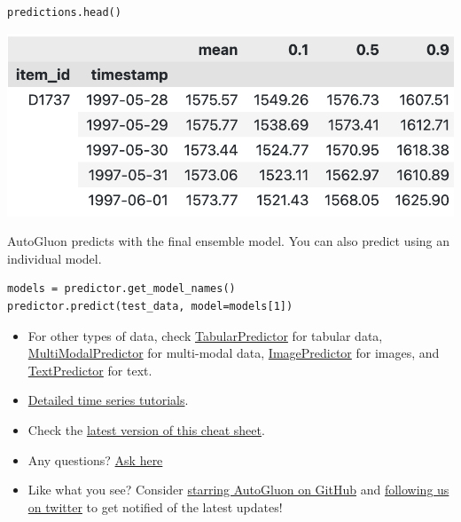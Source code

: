 \begin{verbatim}
predictions.head()
\end{verbatim}

\begin{center}
\includegraphics[width=\linewidth]{timeseries/images/predictions.png}
\end{center}

\medskip

AutoGluon predicts with the final ensemble model. You can also predict using an individual model. 

\begin{verbatim}
models = predictor.get_model_names()
predictor.predict(test_data, model=models[1])
\end{verbatim}




\begin{itemize}
  \item For other types of data, check
  \href{https://auto.gluon.ai/stable/tutorials/tabular_prediction/index.html}{TabularPredictor} for tabular data,
  \href{https://auto.gluon.ai/stable/tutorials/multimodal/index.html}{MultiModalPredictor} for multi-modal data,
  \href{https://auto.gluon.ai/stable/tutorials/image_prediction/index.html}{ImagePredictor} for images, and \href{https://auto.gluon.ai/stable/tutorials/text_prediction/index.html}{TextPredictor} for text. 
  \item \href{https://auto.gluon.ai/stable/tutorials/timeseries/index.html}{Detailed  time series tutorials}.
  \item Check the \href{https://auto.gluon.ai/stable/cheatsheet.html}{latest version of this cheat sheet}.
  \item Any questions? \href{https://github.com/awslabs/autogluon/discussions}{Ask here}
  \item Like what you see? Consider \href{https://github.com/awslabs/autogluon/stargazers}{starring AutoGluon on GitHub} and \href{https://twitter.com/autogluon}{following us on twitter} to get notified of the latest updates!
\end{itemize}


\raggedcolumns


